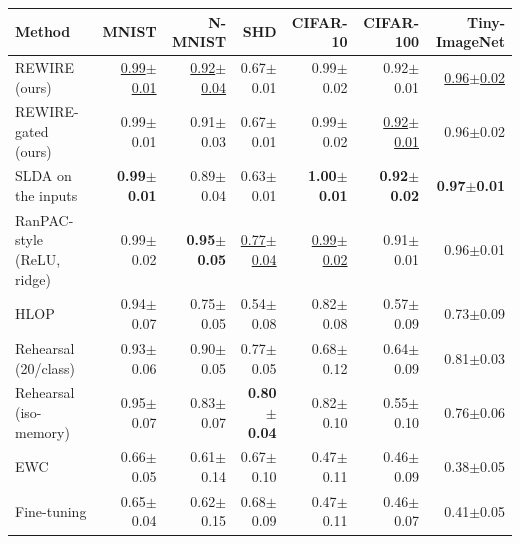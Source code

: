\begin{tabular}{lrrrrrr}
\toprule
Method & MNIST & N-MNIST & SHD & CIFAR-10 & CIFAR-100 & Tiny-ImageNet \\
\midrule
REWIRE (ours) & \underline{0.99{\tiny$\pm$0.01}} & \underline{0.92{\tiny$\pm$0.04}} & 0.67{\tiny$\pm$0.01} & 0.99{\tiny$\pm$0.02} & 0.92{\tiny$\pm$0.01} & \underline{0.96{\tiny$\pm$0.02}} \\
REWIRE-gated (ours) & 0.99{\tiny$\pm$0.01} & 0.91{\tiny$\pm$0.03} & 0.67{\tiny$\pm$0.01} & 0.99{\tiny$\pm$0.02} & \underline{0.92{\tiny$\pm$0.01}} & 0.96{\tiny$\pm$0.02} \\
SLDA on the inputs & \textbf{0.99{\tiny$\pm$0.01}} & 0.89{\tiny$\pm$0.04} & 0.63{\tiny$\pm$0.01} & \textbf{1.00{\tiny$\pm$0.01}} & \textbf{0.92{\tiny$\pm$0.02}} & \textbf{0.97{\tiny$\pm$0.01}} \\
RanPAC-style (ReLU, ridge) & 0.99{\tiny$\pm$0.02} & \textbf{0.95{\tiny$\pm$0.05}} & \underline{0.77{\tiny$\pm$0.04}} & \underline{0.99{\tiny$\pm$0.02}} & 0.91{\tiny$\pm$0.01} & 0.96{\tiny$\pm$0.01} \\
HLOP & 0.94{\tiny$\pm$0.07} & 0.75{\tiny$\pm$0.05} & 0.54{\tiny$\pm$0.08} & 0.82{\tiny$\pm$0.08} & 0.57{\tiny$\pm$0.09} & 0.73{\tiny$\pm$0.09} \\
Rehearsal (20/class) & 0.93{\tiny$\pm$0.06} & 0.90{\tiny$\pm$0.05} & 0.77{\tiny$\pm$0.05} & 0.68{\tiny$\pm$0.12} & 0.64{\tiny$\pm$0.09} & 0.81{\tiny$\pm$0.03} \\
Rehearsal (iso-memory) & 0.95{\tiny$\pm$0.07} & 0.83{\tiny$\pm$0.07} & \textbf{0.80{\tiny$\pm$0.04}} & 0.82{\tiny$\pm$0.10} & 0.55{\tiny$\pm$0.10} & 0.76{\tiny$\pm$0.06} \\
EWC & 0.66{\tiny$\pm$0.05} & 0.61{\tiny$\pm$0.14} & 0.67{\tiny$\pm$0.10} & 0.47{\tiny$\pm$0.11} & 0.46{\tiny$\pm$0.09} & 0.38{\tiny$\pm$0.05} \\
Fine-tuning & 0.65{\tiny$\pm$0.04} & 0.62{\tiny$\pm$0.15} & 0.68{\tiny$\pm$0.09} & 0.47{\tiny$\pm$0.11} & 0.46{\tiny$\pm$0.07} & 0.41{\tiny$\pm$0.05} \\
\bottomrule
\end{tabular}
